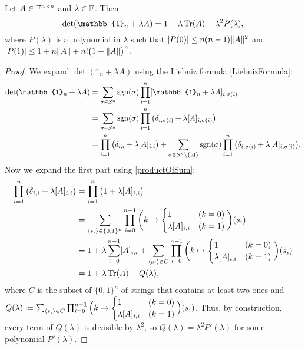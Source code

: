 \begin{proposition} \label{expansionDeterminantAroundIdentity}
Let $A\in \mathbb{F}^{n\times n}$ and $\lambda \in \mathbb{F}$. Then
\[ \det(\mathbb{1}_n + \lambda A) = 1 + \lambda \Tr(A) + \lambda^2P(\lambda), \]
where $P(\lambda)$ is a polynomial in $\lambda$ such that $|P(0)|\leq n(n-1)\lVert A\rVert^2$ and $|P(1)| \leq 1 + n\lVert A\rVert + n!\big(1 + \lVert A\rVert\big)^n$.
\end{proposition}
\begin{proof}
We expand $\det(\mathbb{1}_n + \lambda A)$ using the Liebniz formula \ref{LiebnizFormula}:
\begin{align*}
\det(\mathbb{1}_n + \lambda A) &= \sum_{\sigma\in S^n}\sgn(\sigma)\prod_{i=1}^n[\mathbb{1}_n + \lambda A]_{i,\sigma(i)} \\
&= \sum_{\sigma\in S^n}\sgn(\sigma)\prod_{i=1}^n\big(\delta_{i,\sigma(i)} + \lambda [A]_{i,\sigma(i)}\big) \\
&= \prod_{i=1}^n\big(\delta_{i,i} + \lambda [A]_{i,i}\big) + \sum_{\sigma\in S^n\setminus\{\id\}}\sgn(\sigma)\prod_{i=1}^n\big(\delta_{i,\sigma(i)} + \lambda [A]_{i,\sigma(i)}\big).
\end{align*}
Now we expand the first part using \ref{productOfSum}:
\begin{align*}
\prod_{i=1}^n\big(\delta_{i,i} + \lambda [A]_{i,i}\big) &= \prod_{i=1}^n\big(1 + \lambda [A]_{i,i}\big)\\
&= \sum_{\left\langle s_i \right\rangle\in \{0,1\}^n}\prod_{i=0}^{n-1}\bigg(k\mapsto \begin{cases}
1 & (k=0) \\ \lambda[A]_{i,i} & (k=1)
\end{cases}\bigg)(s_i) \\
&= 1 + \lambda \sum_{i=0}^{n-1}[A]_{i,i} + \sum_{\left\langle s_i \right\rangle\in C}\prod_{i=0}^{n-1}\bigg(k\mapsto \begin{cases}
1 & (k=0) \\ \lambda [A]_{i,i} & (k=1)
\end{cases}\bigg)(s_i) \\
&= 1 + \lambda \operatorname{Tr}(A) + Q(\lambda),
\end{align*}
where $C$ is the subset of $\{0,1\}^n$ of strings that contains at least two ones and $Q(\lambda) \coloneqq \sum_{\left\langle s_i \right\rangle\in C}\prod_{i=0}^{n-1}\Big(k\mapsto \begin{cases}
1 & (k=0) \\ \lambda[A]_{i,i} & (k=1)
\end{cases}\Big)(s_i)$. Thus, by construction, every term of $Q(\lambda)$ is divisible by $\lambda^2$, so $Q(\lambda) = \lambda^2P'(\lambda)$ for some polynomial $P'(\lambda)$.


\end{proof}
